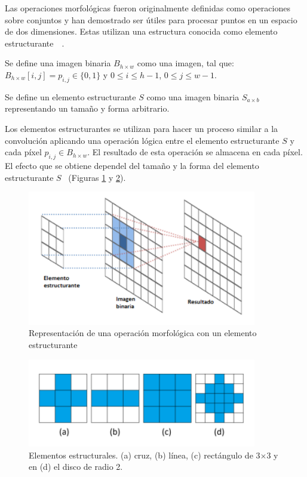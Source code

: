 Las operaciones morfológicas fueron originalmente definidas como operaciones sobre conjuntos y han demostrado ser útiles para procesar puntos en un espacio de dos dimensiones. Estas utilizan una estructura conocida como elemento estructurante~\cite{}~\cite{}.

\begin{definition}
	Se define una imagen binaria $B_{h \times w}$ como una imagen, tal que: $B_{h \times w}[i, j] = p_{i, j} \in \{0, 1\}$ y $0 \leq i \leq h - 1$, $ 0 \leq j \leq w-1$.
\end{definition}

\begin{definition}
	Se define un elemento estructurante $S$ como una imagen binaria $S_{a \times b}$ representando un tamaño y forma arbitrario.
\end{definition}

Los elementos estructurantes se utilizan para hacer un proceso similar a la convolución aplicando una operación lógica entre el elemento estructurante $S$ y cada píxel $p_{i, j} \in B_{h \times w}$. El resultado de esta operación se almacena en cada píxel. El efecto que se obtiene dependel del tamaño y la forma del elemento estructurante $S$~\cite{} (Figuras \ref{fig:estructurante} y \ref{fig:kernel}).

\begin{figure}[h]
	\centering
	\includegraphics[width=10cm]{./Graphics/estructurante.png}
	\caption{Representación de una operación morfológica con un elemento estructurante}
	\label{fig:estructurante}
\end{figure}	

\begin{figure}[h]
	\centering
	\includegraphics[width=10cm]{./Graphics/kernel.png}
	\caption{Elementos estructurales. (a) cruz, (b) línea, (c) rectángulo de 3$\times$3 y en (d) el disco de radio 2.}
	\label{fig:kernel}
\end{figure}

